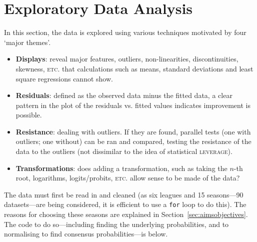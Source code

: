 \documentclass[a4paper,10pt]{report}
\begin{document}
\section{Exploratory Data Analysis}\label{sec:eliteeda}
In this section, the data is explored using various techniques motivated by four `major themes'.
\begin{itemize}
	\item \textbf{Displays}: reveal major features, outliers, non-linearities, discontinuities, skewness, \textsc{etc.} that calculations such as means, standard deviations and least square regressions cannot show.
	\item \textbf{Residuals}: defined as the observed data minus the fitted data, a clear pattern in the plot of the residuals vs. fitted values indicates improvement is possible.
	\item \textbf{Resistance}: dealing with outliers. If they are found, parallel tests (one with outliers; one without) can be ran and compared, testing the resistance of the data to the outliers (not dissimilar to the idea of statistical \textsc{leverage}).
	\item \textbf{Transformations}: does adding a transformation, such as taking the $n$-th root, logarithms, logits/probits, \textsc{etc.} allow sense to be made of the data? \autocite{Hoaglin77}
\end{itemize}

The data must first be read in and cleaned (as six leagues and 15 seasons---90 datasets---are being considered, it is efficient to use a \lstinline|for| loop to do this). The reasons for choosing these seasons are explained in Section~\ref{sec:aimsobjectives}. The code to do so---including finding the underlying probabilities, and to normalising to find consensus probabilities---is below.
\end{document}
